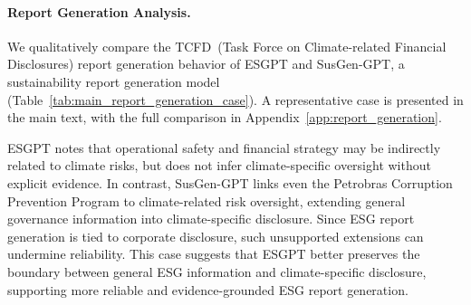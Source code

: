 \documentclass[11pt]{article}
\begin{document}
\paragraph{Report Generation Analysis.}
We qualitatively compare the TCFD~(Task Force on Climate-related Financial Disclosures) report generation behavior of \textsf{ESGPT} and SusGen-GPT, a sustainability report generation model (Table~\ref{tab:main_report_generation_case}). A representative case is presented in the main text, with the full comparison in Appendix~\ref{app:report_generation}.

\textsf{ESGPT} notes that operational safety and financial strategy may be indirectly related to climate risks, but does not infer climate-specific oversight without explicit evidence. In contrast, SusGen-GPT links even the Petrobras Corruption Prevention Program to climate-related risk oversight, extending general governance information into climate-specific disclosure. Since ESG report generation is tied to corporate disclosure, such unsupported extensions can undermine reliability. This case suggests that \textsf{ESGPT} better preserves the boundary between general ESG information and climate-specific disclosure, supporting more reliable and evidence-grounded ESG report generation.


\end{document}
